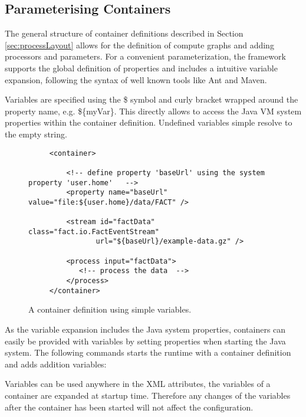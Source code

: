 \subsection{\label{sec:processVariables}Parameterising Containers}
The general structure of container definitions described in Section
\ref{sec:processLayout} allows for the definition of compute graphs
and adding processors and parameters.
For a convenient parameterization, the \streams framework supports the
global definition of properties and includes a intuitive variable
expansion, following the syntax of well known tools like Ant and
Maven.

Variables are specified using the {\ttfamily \$} symbol and curly
bracket wrapped around the property name, e.g. {\ttfamily
  \$\{myVar\}}. This directly allows to access the Java VM system
properties within the container definition. Undefined variables
simple resolve to the empty string.

\begin{figure}[h!]
  \centering
  \begin{lstlisting}
     <container>

         <!-- define property 'baseUrl' using the system property 'user.home'   -->
         <property name="baseUrl" value="file:${user.home}/data/FACT" />

         <stream id="factData" class="fact.io.FactEventStream"
                url="${baseUrl}/example-data.gz" />

         <process input="factData">
            <!-- process the data  -->
         </process>
     </container>
  \end{lstlisting}
  \caption{\label{fig:propertyExample}A container definition using simple variables.}
\end{figure}

As the variable expansion includes the Java system properties, containers
can easily be provided with variables by setting properties when starting
the Java system. The following commands starts the \streams runtime with
a container definition and adds addition variables:

\vspace{1ex}\hspace{2ex}

Variables can be used anywhere in the XML attributes, the variables of
a container are expanded at startup time. Therefore any changes of the
variables after the container has been started will not affect the
configuration.
